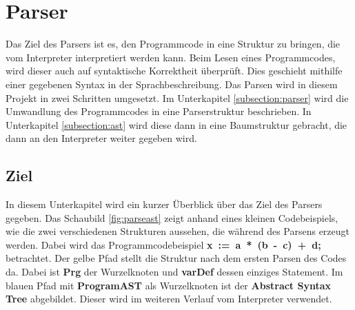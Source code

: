 \section{Parser}

Das Ziel des Parsers ist es, den Programmcode in eine Struktur zu bringen, die vom Interpreter interpretiert werden kann. Beim Lesen eines Programmcodes, wird dieser auch auf syntaktische Korrektheit überprüft. Dies geschieht mithilfe einer gegebenen Syntax in der Sprachbeschreibung.
Das Parsen wird in diesem Projekt in zwei Schritten umgesetzt. Im Unterkapitel \ref{subsection:parser} wird die Umwandlung des Programmcodes in eine Parserstruktur beschrieben. In Unterkapitel \ref{subsection:ast} wird diese dann in eine Baumstruktur gebracht, die dann an den Interpreter weiter gegeben wird. 

\subsection{Ziel}

In diesem Unterkapitel wird ein kurzer Überblick über das Ziel des Parsers gegeben. Das Schaubild \ref{fig:parseast} zeigt anhand eines kleinen Codebeispiels, wie die zwei verschiedenen Strukturen aussehen, die während des Parsens erzeugt werden. Dabei wird das Programmcodebeispiel \mbox{\textbf{x := a * (b - c) + d;}} betrachtet. Der gelbe Pfad stellt die Struktur nach dem ersten Parsen des Codes da. Dabei ist \textbf{Prg} der Wurzelknoten und \textbf{varDef} dessen einziges Statement. Im blauen Pfad mit \textbf{ProgramAST} als Wurzelknoten ist der \textbf{Abstract Syntax Tree} abgebildet. Dieser wird im weiteren Verlauf vom Interpreter verwendet.

